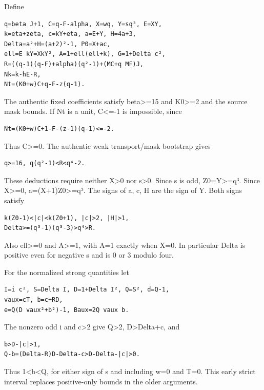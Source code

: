 \documentclass[
  10pt,
]{article}
\begin{document}
Define

\begin{verbatim}
q=beta J+1, C=q-F-alpha, X=wq, Y=sq³, E=XY,
k=eta+zeta, c=kY+eta, a=E+Y, H=4a+3,
Delta=a²+H=(a+2)²-1, P0=X+ac,
ell=E kY=XkY², A=1+ell(ell+k), G=1+Delta c²,
R=((q-1)(q-F)+alpha)(q²-1)+(MC+q MF)J,
Nk=k-hE-R,
Nt=(K0+w)C+q-F-z(q-1).
\end{verbatim}

The authentic fixed coefficients satisfy beta\textgreater=15 and
K0\textgreater=2 and the source mask bounds. If Nt is a unit,
C\textless=-1 is impossible, since

\begin{verbatim}
Nt=(K0+w)C+1-F-(z-1)(q-1)<=-2.
\end{verbatim}

Thus C\textgreater=0. The authentic weak transport/mask bootstrap gives

\begin{verbatim}
q>=16, q(q²-1)<R<q⁴-2.
\end{verbatim}

These deductions require neither X\textgreater0 nor s\textgreater0.
Since s is odd, Z0=\textbar Y\textbar\textgreater=q³. Since
X\textgreater=0, \textbar a\textbar=(X+1)Z0\textgreater=q³. The signs of
a, c, H are the sign of Y. Both signs satisfy

\begin{verbatim}
k(Z0-1)<|c|<k(Z0+1), |c|>2, |H|>1,
Delta>=(q³-1)(q³-3)>q⁴>R.
\end{verbatim}

Also ell\textgreater=0 and A\textgreater=1, with A=1 exactly when X=0.
In particular Delta is positive even for negative s and is 0 or 3 modulo
four.

For the normalized strong quantities let

\begin{verbatim}
I=i c², S=Delta I, D=1+Delta I², Q=S², d=Q-1,
vaux=cT, b=c+RD,
e=Q(D vaux²+b²)-1, Baux=2Q vaux b.
\end{verbatim}

The nonzero odd i and \textbar c\textbar\textgreater2 give
Q\textgreater2, D\textgreater Delta+\textbar c\textbar, and

\begin{verbatim}
b>D-|c|>1,
Q-b=(Delta-R)D-Delta-c>D-Delta-|c|>0.
\end{verbatim}

Thus 1\textless b\textless Q, for either sign of s and including w=0 and
T=0. This early strict interval replaces positive-only bounds in the
older arguments.
\end{document}
